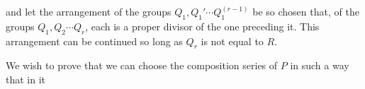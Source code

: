 and let the arrangement of the groups $Q_1, Q_1' \cdots Q_1^{(r-1)}$ be so chosen that, of the groups $Q_1, Q_2 \cdots Q_r$, each is a proper divisor of the one preceding it. This arrangement can be continued so long as $Q_r$ is not equal to $R$.

We wish to prove that we can choose the composition series of $P$ in such a way that in it


